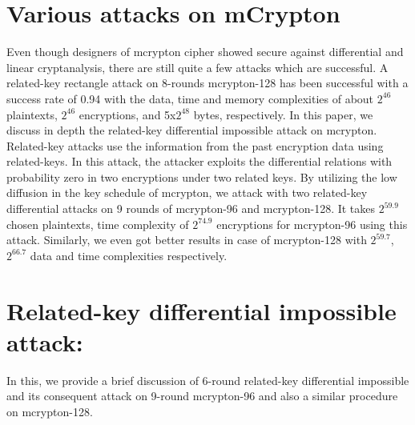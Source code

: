 \documentclass{transcrypto}
\begin{document}
	\section{Various attacks on mCrypton}
	Even though designers of mcrypton cipher showed secure against differential and linear cryptanalysis, there are still quite a few attacks which are successful. A related-key rectangle attack on 8-rounds mcrypton-128 has been successful with a success rate of 0.94 with the data, time and memory complexities of about $2^{46}$ plaintexts, $2^{46}$ encryptions, and 5x$2^{48}$ bytes, respectively. In this paper, we discuss in depth the related-key differential impossible attack on mcrypton.\\
	
	
	Related-key attacks use the information from the past encryption data using related-keys. In this attack, the attacker exploits the differential relations with probability zero in two encryptions under two related keys. By utilizing the low diffusion in the key schedule of mcrypton, we attack with two related-key differential attacks on 9 rounds of mcrypton-96 and mcrypton-128. It takes $2^{59.9}$ chosen plaintexts, time complexity of $2^{74.9}$ encryptions for mcrypton-96 using this attack. Similarly, we even got better results in case of mcrypton-128 with $2^{59.7}$, $2^{66.7}$ data and time complexities respectively.
	
	
	\section{Related-key differential impossible attack:
	}
	In this, we provide a brief discussion of 6-round related-key differential impossible and its consequent attack on 9-round mcrypton-96 and also a similar procedure on mcrypton-128.
\end{document}
